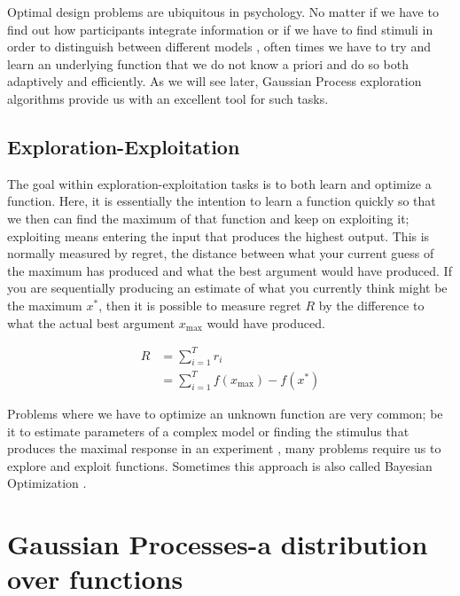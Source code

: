 \documentclass[authoryear,11pt,review]{elsarticle}
\begin{document}
Optimal design problems are ubiquitous in psychology. No matter if we have to find out how participants integrate information \citep{borji2013bayesian} or if we have to find stimuli in order to distinguish between different models \citep{cavagnaro2010adaptive}, often times we have to try and learn an underlying function that we do not know a priori and do so both adaptively and efficiently. As we will see later, Gaussian Process exploration algorithms provide us with an excellent tool for such tasks.


\subsection{Exploration-Exploitation}
The goal within exploration-exploitation tasks is to both learn and optimize a function. Here, it is essentially the intention to learn a function quickly so that we then can find the maximum of that function and keep on exploiting it; exploiting means entering the input that produces the highest output. This is normally measured by regret, the distance between what your current guess of the maximum has produced and what the best argument would have produced. If you are sequentially producing an estimate of what you currently think might be the maximum $x^*$, then it is possible to measure regret $R$ by the difference to what the actual best argument $x_{\text{max}}$ would have produced.

\begin{align*}
R&=\sum_{i=1}^{T}r_i\\
&=\sum_{i=1}^{T}f(x_{\text{max}})-f(x^*)
\end{align*}

Problems where we have to optimize an unknown function are very common; be it to estimate parameters of a complex model \citep{snoek2012practical} or finding the stimulus that produces the maximal response in an experiment \citep{daunizeau2011optimizing}, many problems require us to explore and exploit functions. Sometimes this approach is also called Bayesian Optimization \citep{brochu2010tutorial}.

\section{Gaussian Processes-a distribution over functions}
\end{document}
